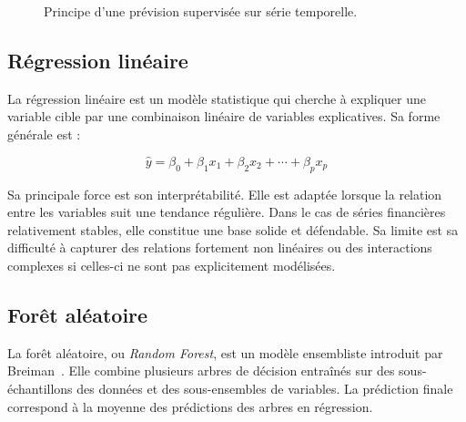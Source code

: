 \begin{figure}[H]
\centering
{}
\caption[Chaîne de prévision supervisée]{Principe d'une prévision supervisée sur série temporelle.}
\label{fig:forecastflow}
\end{figure}

\subsection{Régression linéaire}
\par La régression linéaire est un modèle statistique qui cherche à expliquer
une variable cible par une combinaison linéaire de variables explicatives. Sa
forme générale est :

\begin{equation}
\hat{y} = \beta_0 + \beta_1 x_1 + \beta_2 x_2 + \cdots + \beta_p x_p
\end{equation}

\par Sa principale force est son interprétabilité. Elle est adaptée lorsque la
relation entre les variables suit une tendance régulière. Dans le cas de séries
financières relativement stables, elle constitue une base solide et défendable.
Sa limite est sa difficulté à capturer des relations fortement non linéaires ou
des interactions complexes si celles-ci ne sont pas explicitement modélisées.

\subsection{Forêt aléatoire}
\par La forêt aléatoire, ou \textit{Random Forest}, est un modèle ensembliste
introduit par Breiman~\cite{breiman2001}. Elle combine plusieurs arbres de
décision entraînés sur des sous-échantillons des données et des sous-ensembles de
variables. La prédiction finale correspond à la moyenne des prédictions des
arbres en régression.

